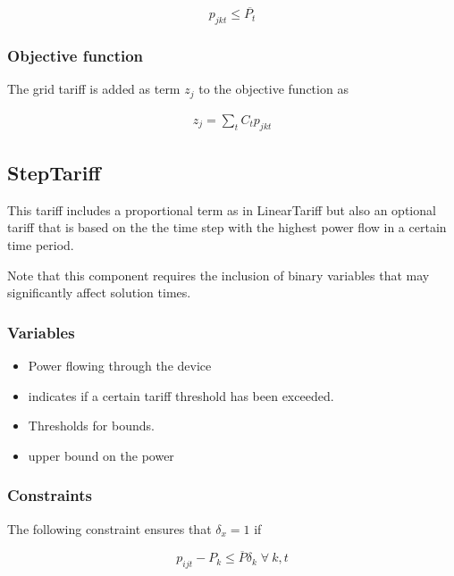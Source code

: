 \documentclass[]{report}
\newcommand{\ub}[1]{\overline{#1}}
\let\oldforall\forall
\renewcommand{\forall}{\; \oldforall \: }
\begin{document}
    \begin{equation}
        p_{jkt} \leq \ub{P_t}
    \end{equation}

\subsubsection{Objective function}

The grid tariff is added as term $z_j$ to the objective function as 

\begin{align}
    z_j = \sum_t C_t p_{jkt}
\end{align}

\newpage
\subsection{StepTariff}
This tariff includes a proportional term as in LinearTariff but also an optional tariff that is based on the the time step with the highest power flow in a certain time period.

Note that this component requires the inclusion of binary variables that may significantly affect solution times.

\subsubsection{Variables}

\begin{itemize}
    \item [$p_{ijt}$] Power flowing through the device
    \item [$\delta_k$] indicates if a certain tariff threshold has been exceeded.
    \item [$P_k$] Thresholds for bounds. 
    \item [$\ub{P}$] upper bound on the power
\end{itemize}

\subsubsection{Constraints}

The following constraint ensures that $\delta_x = 1$ if 

\begin{equation}
    p_{ijt}-P_k \leq \ub{P}\delta_k \forall k,t
\end{equation}
\end{document}
